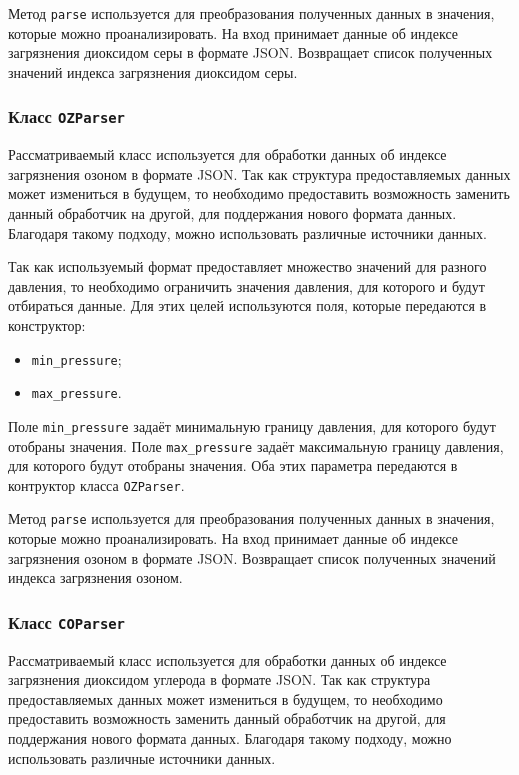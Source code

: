Метод \texttt{parse} используется для преобразования полученных данных в значения, которые можно проанализировать.
На вход принимает данные об индексе загрязнения диоксидом серы в формате JSON.
Возвращает список полученных значений индекса загрязнения диоксидом серы.


\subsubsection{Класс \texttt{OZParser}}
Рассматриваемый класс используется для обработки данных об индексе загрязнения озоном в формате JSON.
Так как структура предоставляемых данных может измениться в будущем, то необходимо предоставить возможность заменить данный обработчик на другой, для поддержания нового формата данных.
Благодаря такому подходу, можно использовать различные источники данных.

Так как используемый формат предоставляет множество значений для разного давления, то необходимо ограничить значения давления, для которого и будут отбираться данные.
Для этих целей используются поля, которые передаются в конструктор:
\begin{itemize}
    \item \texttt{min\_pressure};
    \item \texttt{max\_pressure}.
\end{itemize}

Поле \texttt{min\_pressure} задаёт минимальную границу давления, для которого будут отобраны значения.
Поле \texttt{max\_pressure} задаёт максимальную границу давления, для которого будут отобраны значения.
Оба этих параметра передаются в контруктор класса \texttt{OZParser}.

Метод \texttt{parse} используется для преобразования полученных данных в значения, которые можно проанализировать.
На вход принимает данные об индексе загрязнения озоном в формате JSON.
Возвращает список полученных значений индекса загрязнения озоном.


\subsubsection{Класс \texttt{COParser}}
Рассматриваемый класс используется для обработки данных об индексе загрязнения диоксидом углерода в формате JSON.
Так как структура предоставляемых данных может измениться в будущем, то необходимо предоставить возможность заменить данный обработчик на другой, для поддержания нового формата данных.
Благодаря такому подходу, можно использовать различные источники данных.

